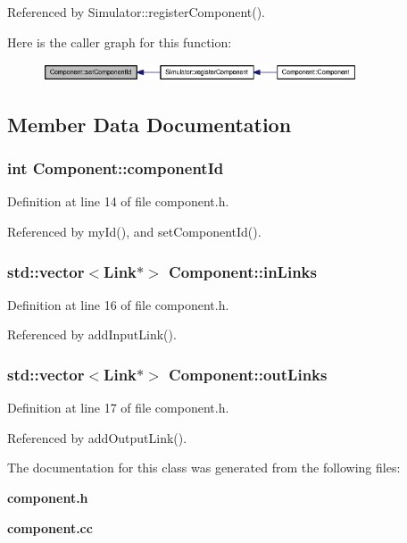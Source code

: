 Referenced by Simulator::registerComponent().

Here is the caller graph for this function:\nopagebreak
\begin{figure}[H]
\begin{center}
\leavevmode
\includegraphics[width=264pt]{classComponent_4a5ca86f7a92e163287c4aae16f6b4b2_icgraph}
\end{center}
\end{figure}


\subsection{Member Data Documentation}
\subsubsection[{componentId}]{\setlength{\rightskip}{0pt plus 5cm}int {\bf Component::componentId}\hspace{0.3cm}{\tt  [private]}}\label{classComponent_64fb5507befa5f64a0d95003ea279c68}




Definition at line 14 of file component.h.

Referenced by myId(), and setComponentId().
\subsubsection[{inLinks}]{\setlength{\rightskip}{0pt plus 5cm}std::vector$<${\bf Link}$\ast$$>$ {\bf Component::inLinks}}\label{classComponent_6c43e56775c15cfcc1c0e8a6cbc7c474}




Definition at line 16 of file component.h.

Referenced by addInputLink().
\subsubsection[{outLinks}]{\setlength{\rightskip}{0pt plus 5cm}std::vector$<${\bf Link}$\ast$$>$ {\bf Component::outLinks}}\label{classComponent_4f715c718ecdb440f200e954b5d35b10}




Definition at line 17 of file component.h.

Referenced by addOutputLink().

The documentation for this class was generated from the following files:\begin{CompactItemize}
\item 
{\bf component.h}\item 
{\bf component.cc}\end{CompactItemize}
